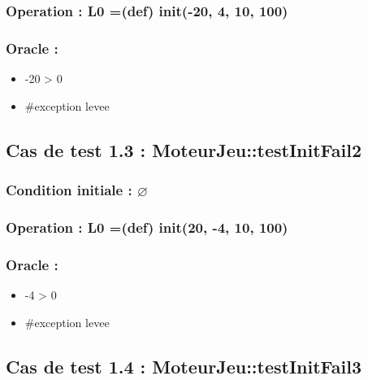 \documentclass[11pt]{article}
\begin{document}
\subsubsection{Operation : L0 =(def) init(-20, 4, 10, 100)}
\label{sec-1.2.2}

\subsubsection{Oracle :}
\label{sec-1.2.3}

\begin{itemize}

\item -20 > 0\\
\label{sec-1.2.3.1}


\item \#exception levee\\
\label{sec-1.2.3.2}


\end{itemize} %
\subsection{Cas de test 1.3 : MoteurJeu::testInitFail2}
\label{sec-1.3}

\subsubsection{Condition initiale : $\varnothing$}
\label{sec-1.3.1}

\subsubsection{Operation : L0 =(def) init(20, -4, 10, 100)}
\label{sec-1.3.2}

\subsubsection{Oracle :}
\label{sec-1.3.3}

\begin{itemize}

\item -4 > 0\\
\label{sec-1.3.3.1}


\item \#exception levee\\
\label{sec-1.3.3.2}


\end{itemize} %
\subsection{Cas de test 1.4 : MoteurJeu::testInitFail3}
\label{sec-1.4}
\end{document}
